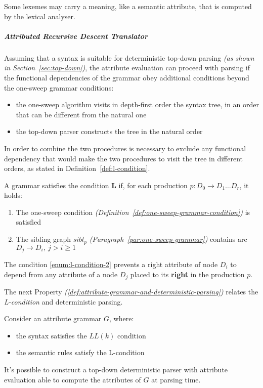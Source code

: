 \documentclass[english]{article}
\begin{document}
Some lexemes may carry a meaning, like a semantic attribute, that is computed by the lexical analyser.

\subparagraph{Attributed Recursive Descent Translator}

Assuming that a syntax is suitable for deterministic top-down parsing \textit{(as shown in Section~\ref{sec:top-down})}, the attribute evaluation can proceed with parsing if the functional dependencies of the grammar obey additional conditions beyond the one-sweep grammar conditions:

\begin{itemize}
  \item the one-sweep algorithm visits in depth-first order the syntax tree, in an order that can be different from the natural one
  \item the top-down parser constructs the tree in the natural order
\end{itemize}

In order to combine the two procedures is necessary to exclude any functional dependency that would make the two procedures to visit the tree in different orders, as stated in Definition~\ref{def:l-condition}.

\begin{definition}[L-condition]
  \label{def:l-condition}
  A grammar satisfies the condition \textbf{L} if, for each production \(p: D_0 \rightarrow D_1 \ldots D_r\), it holds:

  \begin{enumerate}[label=\alph*., ref=(\alph*)]
    \item\label{enum:l-condition-1} The one-sweep condition \textit{(Definition~\ref{def:one-sweep-grammar-condition})} is satisfied
    \item\label{enum:l-condition-2} The sibling graph \(\textit{sibl}_p\) \textit{(Paragraph~\ref{par:one-sweep-grammar})} contains arc \(D_j \rightarrow D_i, \ j > i \geq 1\)
  \end{enumerate}
\end{definition}

The condition \ref{enum:l-condition-2} prevents a right attribute of node \(D_i\) to depend from any attribute of a node \(D_j\) placed to its \textbf{right} in the production \(p\).

\bigskip
The next Property \textit{(\ref{def:attribute-grammar-and-deterministic-parsing})} relates the \textit{L-condition} and deterministic parsing.

\begin{definition}
  \label{def:attribute-grammar-and-deterministic-parsing}
  Consider an attribute grammar \(G\), where:

  \begin{itemize}
    \item the syntax satisfies the \(LL(k)\) condition
    \item the semantic rules satisfy the L-condition
  \end{itemize}

  It's possible to construct a top-down deterministic parser with attribute evaluation able to compute the attributes of \(G\) at parsing time.
\end{definition}
\end{document}
